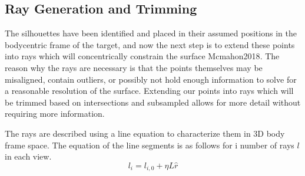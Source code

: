 \subsection{Ray Generation and Trimming}


The silhouettes have been identified and placed in their assumed positions in the bodycentric frame of the target, and now the next step is to extend these points into rays which will concentrically constrain the surface {Mcmahon2018}. The reason why the rays are necessary is that the points themselves may be misaligned, contain outliers, or possibly not hold enough information to solve for a reasonable resolution of the surface. Extending our points into rays which will be trimmed based on intersections and subsampled allows for more detail without requiring more information. 


The rays are described using a line equation to characterize them in 3D body frame space. The equation of the line segments is as follows for i number of rays $l$ in each view. 
\begin{equation}
    l_i = l_{i,0} + \eta L \hat{r}
\end{equation}


